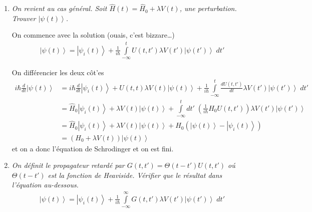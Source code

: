\documentclass[10pt]{report}
\newcommand{\ket}[1]{\left|#1\right>}
\newcommand{\rd}[2]{\frac{d#1}{d#2}}
\begin{document}
\begin{enumerate}[1)]
        Quand $L \to \infty$ on remplace $\frac{1}{L}\sum\limits_{n}^{} \to \frac{1}{2\pi\hbar}\int\limits_{-\infty}^{\infty}dp$. Si on note $\Delta p = \frac{2\pi \hbar}{L}$, alors la nombre des $\Delta p$ entre $(p, p + dp)$ est donn\'ee par $dn = \frac{L}{2\pi\hbar}dp$. La somme est en effet une int\'egrale de $dn$, et donc on a la resultat qu'on voulait. Finalement
        \begin{align}
            U(t,x,t_0,x_0) &= \frac{1}{2\pi\hbar}\int\limits_{-\infty}^{\infty}dp\;\exp\left[ \frac{i}{\hbar}\left( \frac{2n\pi\hbar}{L}(x-x_0) - \frac{p^2}{2m}(t-t_0) \right) \right]
        \end{align}

    \item \emph{On revient au cas g\'en\'eral. Soit $\hat{H}(t) = \hat{H}_0 + \lambda \hat{V}(t)$, une perturbation. Trouver $\ket{\psi(t)}$.}

        On commence avec la solution (ouais, c'est bizzare\dots)
        \begin{align}
            \ket{\psi(t)} = \ket{\psi_{i}(t)} + \frac{1}{i\hbar}\int\limits_{-\infty}^{t}U(t,t')\lambda V(t')\ket{\psi(t')}\;dt'\label{01.10.sol}
        \end{align}

        On diff\'erencier les deux c\^ot'es
        \begin{align}
            i\hbar \rd{}{t}\ket{\psi(t)} &= i\hbar \rd{}{t}\ket{\psi_{i}(t)} + U(t,t)\lambda V(t)\ket{\psi(t)} + \frac{1}{i\hbar}\int\limits_{-\infty}^{t}\rd{U(t,t')}{t}\lambda V(t')\ket{\psi(t')}\;dt' \\
            &= \hat{H}_0 \ket{\psi_{i}(t)} + \lambda V(t)\ket{\psi(t)} + \int\limits_{-\infty}^{t}dt'\;\left( \frac{1}{i\hbar}H_0U(t,t') \right)\lambda V(t')\ket{\psi(t')}\\
            &= \hat{H}_0 \ket{\psi_{i}(t)} + \lambda V(t)\ket{\psi(t)} + H_0\left( \ket{\psi(t)} - \ket{\psi_i(t)} \right)\\
            &= \left( H_0 + \lambda V(t) \right)\ket{\psi(t)}
        \end{align}
        et on a donc l'\'equation de Schrodinger et on est fini.
    \item \emph{On d\'efinit le propagateur retard\'e par $G(t,t') = \Theta(t-t') U(t,t')$ o\'u $\Theta(t-t')$ est la fonction de Heaviside. V\'erifier que le r\'esultat dans l'\'equation au-dessous.}
        \begin{align}
            \ket{\psi(t)} = \ket{\psi_{i}(t)} + \frac{1}{i\hbar}\int\limits_{-\infty}^{\infty}G(t,t')\lambda V(t')\ket{\psi(t')}\;dt'
        \end{align}


\end{enumerate}
\end{document}
